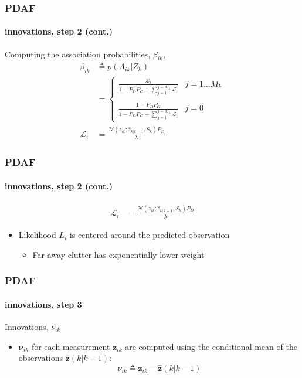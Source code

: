 \begin{frame}
\frametitle{PDAF}
\framesubtitle{innovations, step 2 (cont.)}
\logoCSIPCPL\mypagenum
	Computing the association probabilities, $\beta_{ik}$,
	\begin{align*}
		\beta_{ik} &\triangleq p(A_{ik}|Z_k)\\
				&=	\left\{ 
						\begin{array}{cc}
							\frac{\mathcal{L}_i}{1-P_DP_G + \sum\limits_{j=1}^{j=M_k} \mathcal{L}_i}  & j=1 \ldots M_k\\ \\
							\frac{1-P_DP_G}{1-P_DP_G + \sum\limits_{j=1}^{j=M_k} \mathcal{L}_i} & j=0
						\end{array} 
					\right. \\
		\mathcal{L}_i&= \frac{\mathcal{N}  (z_{ik};  \hat{z}_{k|k-1}, S_k)P_D}{\lambda}
	\end{align*}
\end{frame}




\begin{frame}
\frametitle{PDAF}
\framesubtitle{innovations, step 2 (cont.)}
\logoCSIPCPL\mypagenum	
	\begin{align*}
		\mathcal{L}_i&= \frac{\mathcal{N}  (z_{ik};  \hat{z}_{k|k-1}, S_k)P_D}{\lambda}
	\end{align*}
	\begin{itemize}
		\item Likelihood $L_i$ is centered around the predicted observation
		\begin{itemize}
			\item Far away clutter has exponentially lower weight
		\end{itemize}
	\end{itemize}
\end{frame}




\begin{frame}
\frametitle{PDAF}
\framesubtitle{innovations, step 3}
\logoCSIPCPL\mypagenum
	{\color{red} Innovations, $\nu_{ik}$}
	\begin{itemize}
		\item $\mathbf{\nu}_{ik}$  for each measurement $\mathbf{z}_{ik}$ are computed using the conditional mean of the observations $\hat{\mathbf{z}}(k|k-1)$:
		\begin{equation*}
			\nu_{ik}  \triangleq \mathbf{z}_{ik} - \hat{\mathbf{z}}(k|k-1) 
		\end{equation*}
	\end{itemize}
\end{frame}



